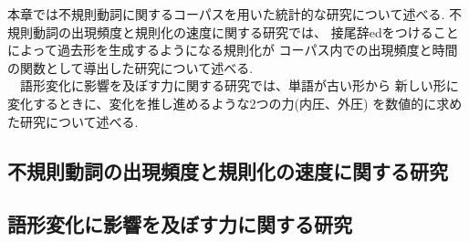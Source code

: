 本章では不規則動詞に関するコーパスを用いた統計的な研究について述べる.
不規則動詞の出現頻度と規則化の速度に関する研究では、
接尾辞edをつけることによって過去形を生成するようになる規則化が
コーパス内での出現頻度と時間の関数として導出した研究について述べる.\\
　語形変化に影響を及ぼす力に関する研究では、単語が古い形から
新しい形に変化するときに、変化を推し進めるような2つの力(内圧、外圧)
を数値的に求めた研究について述べる.


\subsection{不規則動詞の出現頻度と規則化の速度に関する研究}
\subsection{語形変化に影響を及ぼす力に関する研究}
